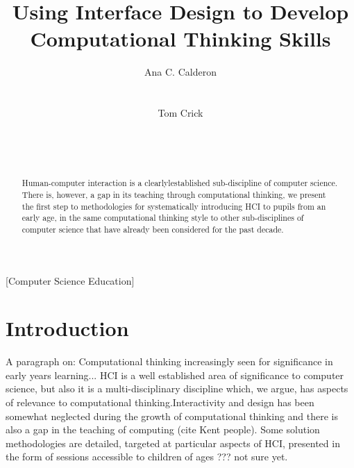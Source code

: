 \documentclass{sig-alternate}
\begin{document}
%

\title{Using Interface Design to Develop\\Computational Thinking Skills}


\author{
\alignauthor
Ana C. Calderon\\
\\
\\
\alignauthor
Tom Crick\\
\\
\\
\\
}

\maketitle

\begin{abstract}
Human-computer interaction is a clearlylestablished sub-discipline of
computer science. There is, however, a gap in its teaching through
computational thinking, we present the first step to methodologies for
systematically introducing HCI to pupils from an early age, in the
same computational thinking style to other sub-disciplines of computer
science that have already been considered for the past decade.
\end{abstract}

[Computer Science Education]

\section{Introduction}
A paragraph on: Computational thinking increasingly seen for significance in early years learning...
HCI is a well established area of significance to computer science, but also it is a multi-disciplinary discipline which, we argue, has aspects of relevance to computational thinking.Interactivity and design has been somewhat neglected during the growth of computational thinking and there is also a gap in the teaching of computing (cite Kent people). Some solution methodologies are detailed, targeted at particular aspects of HCI, presented in the form of sessions accessible to children of ages ??? not sure yet.
\end{document}
